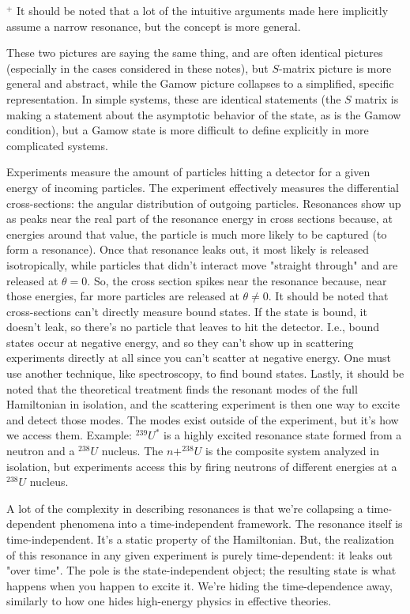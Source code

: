$^+$ It should be noted that a lot of the intuitive arguments made here implicitly assume a narrow resonance, but the concept is more general.

These two pictures are saying the same thing, and are often identical pictures (especially in the cases considered in these notes), but $S$-matrix picture is more general and abstract, while the Gamow picture collapses to a simplified, specific representation. In simple systems, these are identical statements (the $S$ matrix is making a statement about the asymptotic behavior of the state, as is the Gamow condition), but a Gamow state is more difficult to define explicitly in more complicated systems.

Experiments measure the amount of particles hitting a detector for a given energy of incoming particles. The experiment effectively measures the differential cross-sections: the angular distribution of outgoing particles. Resonances show up as peaks near the real part of the resonance energy in cross sections because, at energies around that value, the particle is much more likely to be captured (to form a resonance). Once that resonance leaks out, it most likely is released isotropically, while particles that didn't interact move "straight through" and are released at $\theta=0$. So, the cross section spikes near the resonance because, near those energies, far more particles are released at $\theta\ne0$. It should be noted that cross-sections can't directly measure bound states. If the state is bound, it doesn't leak, so there's no particle that leaves to hit the detector. I.e., bound states occur at negative energy, and so they can't show up in scattering experiments directly at all since you can't scatter at negative energy. One must use another technique, like spectroscopy, to find bound states. Lastly, it should be noted that the theoretical treatment finds the resonant modes of the full Hamiltonian in isolation, and the scattering experiment is then one way to excite and detect those modes. The modes exist outside of the experiment, but it's how we access them. Example:
$^{239}U^*$ is a highly excited resonance state formed from a neutron and a $^{238}U$ nucleus. The $n+^{238}U$ is the composite system analyzed in isolation, but experiments access this by firing neutrons of different energies at a $^{238}U$ nucleus.

A lot of the complexity in describing resonances is that we're collapsing a time-dependent phenomena into a time-independent framework. The resonance itself is time-independent. It's a static property of the Hamiltonian. But, the realization of this resonance in any given experiment is purely time-dependent: it leaks out "over time". The pole is the state-independent object; the resulting state is what happens when you happen to excite it. We're hiding the time-dependence away, similarly to how one hides high-energy physics in effective theories.

